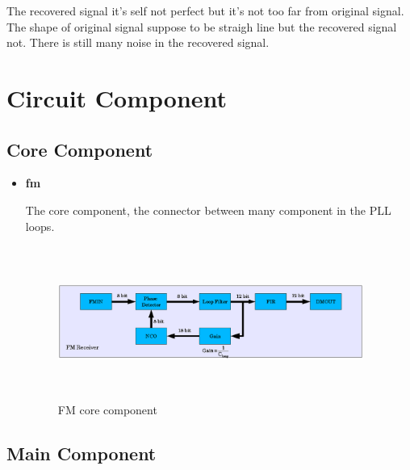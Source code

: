 \documentclass[a4paper,10pt]{article}
\begin{document}
The recovered signal it's self not perfect but it's not too far from
original signal. The shape of original signal suppose to be straigh line
but the recovered signal not. There is still many noise in the recovered
signal.

\section{Circuit Component}

\subsection{Core Component}

\begin{itemize}

\item \textbf{fm}

The core component, the connector between many component in the PLL
loops.

\begin{figure}[H]
\center
\includegraphics[width=10.0cm,height=5.0cm]{fm.eps}
\caption {FM core component}
\end{figure}

\end{itemize}

\subsection{Main Component}
\end{document}
